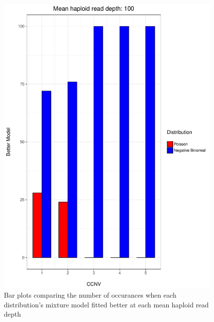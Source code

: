 \documentclass[11pt]{article}
\begin{document}
\begin{figure}
\begin{center}
\includegraphics[scale=0.28]{../Results/Second_Analysis/Better_model_bar100.pdf}
\end{center}
\caption{Bar plots comparing the number of occurances when each distribution's mixture model fitted better at each mean haploid read depth}
\end{figure}
\end{document}
